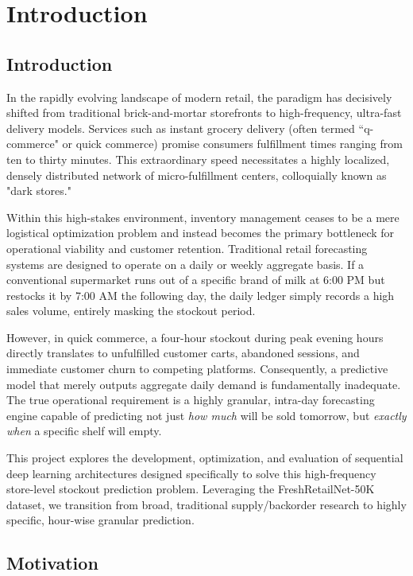 \chapter{Introduction}
\label{chap:intro}

\section{Introduction}

In the rapidly evolving landscape of modern retail, the paradigm has decisively shifted from traditional brick-and-mortar storefronts to high-frequency, ultra-fast delivery models. Services such as instant grocery delivery (often termed ``q-commerce" or quick commerce) promise consumers fulfillment times ranging from ten to thirty minutes. This extraordinary speed necessitates a highly localized, densely distributed network of micro-fulfillment centers, colloquially known as "dark stores." 

Within this high-stakes environment, inventory management ceases to be a mere logistical optimization problem and instead becomes the primary bottleneck for operational viability and customer retention. Traditional retail forecasting systems are designed to operate on a daily or weekly aggregate basis. If a conventional supermarket runs out of a specific brand of milk at 6:00 PM but restocks it by 7:00 AM the following day, the daily ledger simply records a high sales volume, entirely masking the stockout period. 

However, in quick commerce, a four-hour stockout during peak evening hours directly translates to unfulfilled customer carts, abandoned sessions, and immediate customer churn to competing platforms. Consequently, a predictive model that merely outputs aggregate daily demand is fundamentally inadequate. The true operational requirement is a highly granular, intra-day forecasting engine capable of predicting not just \textit{how much} will be sold tomorrow, but \textit{exactly when} a specific shelf will empty. 

This project explores the development, optimization, and evaluation of sequential deep learning architectures designed specifically to solve this high-frequency store-level stockout prediction problem. Leveraging the FreshRetailNet-50K dataset, we transition from broad, traditional supply/backorder research to highly specific, hour-wise granular prediction.

\section{Motivation}

